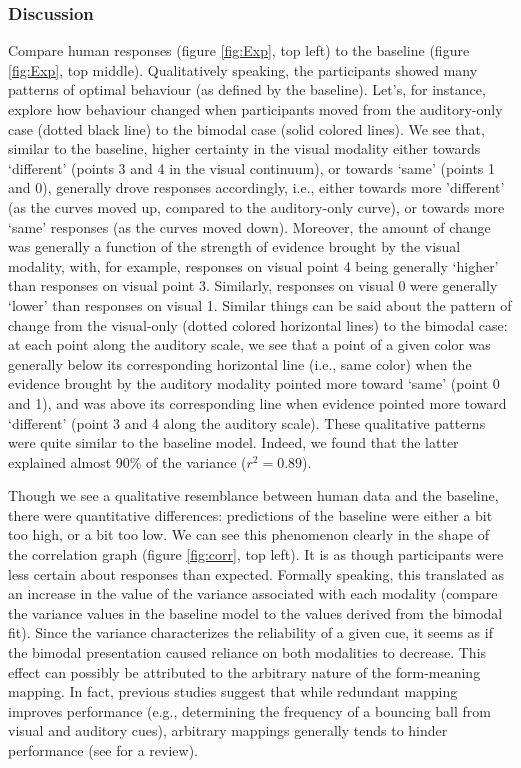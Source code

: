 \documentclass[10pt,letterpaper]{article}
\begin{document}
\subsubsection{Discussion}
Compare human responses (figure \ref{fig:Exp}, top left) to the baseline (figure \ref{fig:Exp}, top middle). Qualitatively speaking, the participants showed many patterns of optimal behaviour (as defined by the baseline). Let's, for instance, explore how behaviour changed when participants moved from the auditory-only case (dotted black line) to the bimodal case (solid colored lines).  We see that, similar to the baseline, higher certainty in the visual modality either towards `different' (points 3 and 4 in the visual continuum), or towards `same' (points 1 and 0), generally drove responses accordingly, i.e., either towards more 'different' (as the curves moved up, compared to the auditory-only curve), or towards more `same' responses (as the curves moved down). Moreover, the amount of change was generally a function of the strength of evidence brought by the visual modality, with, for example, responses on visual point 4 being generally `higher' than responses on visual point 3. Similarly, responses on visual 0 were generally `lower' than responses on visual 1. Similar things can be said about the pattern of change from the visual-only (dotted colored horizontal lines) to the bimodal case: at each point along the auditory scale, we see that a point of a given color was generally below its corresponding horizontal line (i.e., same color) when the evidence brought by the auditory modality pointed more toward `same' (point 0 and 1), and was above its corresponding line when evidence pointed more toward `different' (point 3 and 4 along the auditory scale). These qualitative patterns were quite similar to the baseline model. Indeed, we found that the latter explained almost 90\% of the variance  ($r^2=0.89$).

Though we see a qualitative resemblance between human data and the baseline, there were quantitative differences: predictions of the baseline were either a bit too high, or a bit too low. We can see this phenomenon clearly in the shape of the correlation graph (figure \ref{fig:corr}, top left). It is as though participants were less certain about responses than expected. Formally speaking, this translated as an increase in the value of the variance associated with each modality (compare the variance values in the baseline model to the values derived from the bimodal fit).  Since the variance characterizes the reliability of a given cue, it seems as if the bimodal presentation caused reliance on both modalities to decrease.  This effect can possibly be attributed to the arbitrary nature of the form-meaning mapping. In fact, previous studies suggest that while redundant mapping improves performance (e.g., determining the frequency of a bouncing ball from visual and auditory cues), arbitrary mappings generally tends to hinder performance (see  for a review).
\end{document}
